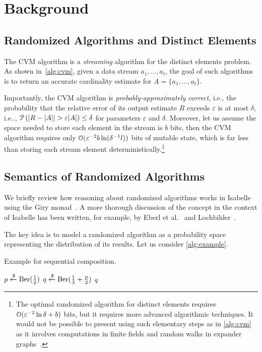 \section{Background}
\label{sec:background}

\subsection{Randomized Algorithms and Distinct Elements}

The CVM algorithm is a \emph{streaming} algorithm for the distinct elements problem.
As shown in~\cref{alg:cvm}, given a data stream $a_1,\dots, a_l$, the goal of such algorithms is to return an accurate cardinality estimate for $A = \{a_1,\dots,a_l\}$.

Importantly, the CVM algorithm is \emph{probably-approximately correct}, i.e., the probability that the relative error of its output estimate $R$ exceeds $\varepsilon$ is at most $\delta$, i.e.., $\operatorname{\mathcal P} \left( |R - |A| | > \varepsilon |A| \right) \leq \delta$ for parameters $\varepsilon$ and $\delta$. %
Moreover, let us assume the space needed to store each element in the stream is $b$ bits, then the CVM algorithm requires only $\operatorname{\mathcal O}(\varepsilon^{-2} b \ln(\delta^{-1} l))$ bits of mutable state, which is far less than storing each stream element deterministically.\footnote{The optimal randomized algorithm for distinct elements requires $\operatorname{\mathcal O}( \varepsilon^{-2} \ln \delta + b)$ bits, but it requires more advanced algorithmic techniques. It would not be possible to present using such elementary steps as in \cref{alg:cvm} as it involves computations in finite fields and random walks in expander graphs~\cite{blasiok2020, karayel2023}.}

\subsection{Semantics of Randomized Algorithms}
We briefly review how reasoning about randomized algorithms works in Isabelle using the Giry monad~\cite{giry1982}.
A more thorough discussion of the concept in the context of Isabelle has been written, for example, by Eberl et al.~\cite{eberl2020} and Lochbihler~\cite{lochbihler2016}.

The key idea is to model a randomized algorithm as a probability space representing the distribution of its results.
Let us consider \cref{alg:example}.
\begin{algorithm}[h!]
\caption{Example for sequential composition.}\label{alg:example}
\begin{algorithmic}[1]
\State $p \xleftarrow{\$} \operatorname{\mathrm{Ber}}(\frac{1}{2})$
\State $q \xleftarrow{\$} \operatorname{\mathrm{Ber}}(\frac{1}{3}+\frac{p}{2})$
\State \Return $q$
\end{algorithmic}
\end{algorithm}%

